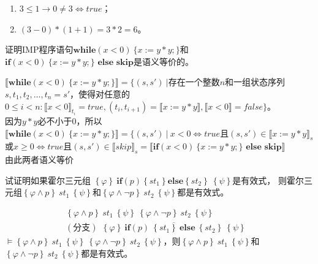\documentclass[11pt,a4paper]{article}
\begin{document}
\begin{solution}
	\begin{enumerate}
    	\item $3 \le 1 \rightarrow 0 \neq 3\Leftrightarrow true$；
    	\item $(3-0)*(1+1)=3*2=6$。
	\end{enumerate}
\end{solution}

\subproblem 证明IMP程序语句$\textbf{while}(x<0)\ \{x := y * y;\}$和$\textbf{if}(x<0)\ \{x := y * y;\}\textbf{\ else\ skip}$是语义等价的。

\begin{solution}
    $\llbracket{\textbf{while}(x<0)\ \{x := y * y;\}}\rrbracket=\{(s,s')\ |$存在一个整数$n$和一组状态序列$s,t_1,t_2,\dots,t_n=s'$，使得对任意的$0\leq i < n:\llbracket{x<0}\rrbracket_{t_i}=true,(t_i,t_{i+1})=\llbracket{x:=y*y}\rrbracket,\llbracket{x<0}\rrbracket=false\}$。\\
    因为$y*y$必不小于0，所以$\llbracket{\textbf{while}(x<0)\ \{x := y * y;\}}\rrbracket=\{(s,s')\ |\ x<0\Leftrightarrow true$且$(s,s')\in \llbracket{x:=y*y}\rrbracket_s$或$x\geq0\Leftrightarrow true$且$(s,s')\in\llbracket{skip}\rrbracket_s=\llbracket{\textbf{if}(x<0)\ \{x := y * y;\}\textbf{\ else\ skip}}\rrbracket$\\
    由此两者语义等价
\end{solution}

\newpage
{}

\subproblem 试证明如果霍尔三元组
$\left\{\varphi\right\}\ \textbf{if}(p)\left\{st_1\right\} \textbf{else} \left\{st_2\right\}\ \left\{\psi\right\}$是有效式，
则霍尔三元组$\left\{\varphi\wedge p\right\}\ st_1\ \left\{\psi\right\}$和$\left\{\varphi\wedge \neg p\right\}\ st_2\ \left\{\psi\right\}$都是有效式。
\begin{solution}
	\begin{align*}
		\left\{\varphi\wedge p\right\}\ st_1\ \left\{\psi\right\}\ \left\{\varphi\wedge \neg p\right\}\ st_2\ \left\{\psi\right\}& \\
		(\text{分支})\ \ \overline{\left\{\varphi\right\}\ \textbf{if}(p)\ \left\{st_1\right\}\ \textbf{else}\ \left\{st_2\right\}\ \left\{\psi\right\}}&
	\end{align*}
	$\models \left\{\varphi\wedge p\right\}\ st_1\ \left\{\psi\right\}\ \left\{\varphi\wedge \neg p\right\}\ st_2\ \left\{\psi\right\}$，则$\left\{\varphi\wedge p\right\}\ st_1\ \left\{\psi\right\}$和$\left\{\varphi\wedge \neg p\right\}\ st_2\ \left\{\psi\right\}$都是有效式。\\
\end{solution}
\end{document}
